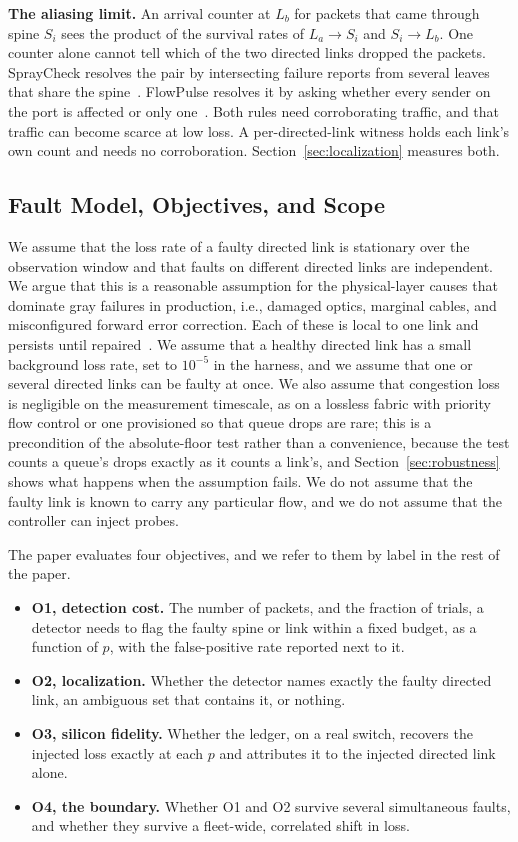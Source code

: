 \textbf{The aliasing limit.} An arrival counter at $L_b$ for packets that came through spine $S_i$ sees the product of the survival rates of $L_a\!\rightarrow\!S_i$ and $S_i\!\rightarrow\!L_b$. One counter alone cannot tell which of the two directed links dropped the packets. SprayCheck resolves the pair by intersecting failure reports from several leaves that share the spine~\cite{spraycheck}. FlowPulse resolves it by asking whether every sender on the port is affected or only one~\cite{flowpulse}. Both rules need corroborating traffic, and that traffic can become scarce at low loss. A per-directed-link witness holds each link's own count and needs no corroboration. Section~\ref{sec:localization} measures both.

\subsection{Fault Model, Objectives, and Scope}
\label{sec:scope}

We assume that the loss rate of a faulty directed link is stationary over the observation window and that faults on different directed links are independent. We argue that this is a reasonable assumption for the physical-layer causes that dominate gray failures in production, i.e., damaged optics, marginal cables, and misconfigured forward error correction. Each of these is local to one link and persists until repaired~\cite{corropt}. We assume that a healthy directed link has a small background loss rate, set to $10^{-5}$ in the harness, and we assume that one or several directed links can be faulty at once. We also assume that congestion loss is negligible on the measurement timescale, as on a lossless fabric with priority flow control or one provisioned so that queue drops are rare; this is a precondition of the absolute-floor test rather than a convenience, because the test counts a queue's drops exactly as it counts a link's, and Section~\ref{sec:robustness} shows what happens when the assumption fails. We do not assume that the faulty link is known to carry any particular flow, and we do not assume that the controller can inject probes.

The paper evaluates four objectives, and we refer to them by label in the rest of the paper.
\begin{itemize}
\item \textbf{O1, detection cost.} The number of packets, and the fraction of trials, a detector needs to flag the faulty spine or link within a fixed budget, as a function of $p$, with the false-positive rate reported next to it.
\item \textbf{O2, localization.} Whether the detector names exactly the faulty directed link, an ambiguous set that contains it, or nothing.
\item \textbf{O3, silicon fidelity.} Whether the ledger, on a real switch, recovers the injected loss exactly at each $p$ and attributes it to the injected directed link alone.
\item \textbf{O4, the boundary.} Whether O1 and O2 survive several simultaneous faults, and whether they survive a fleet-wide, correlated shift in loss.
\end{itemize}

